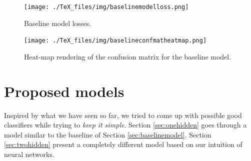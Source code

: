 \begin{figure}
\centering
\texttt{[image: ./TeX\_files/img/baselinemodelloss.png]}
\caption{Baseline model losses.}
\label{fig:baselinemodelloss}
\end{figure}

\begin{figure}
\centering
\texttt{[image: ./TeX\_files/img/baselineconfmatheatmap.png]}
\caption{Heat-map rendering of the confusion matrix for the baseline model.}
\label{fig:baselineconfmatheatmap}
\end{figure}

\begin{table}
\centering
{}
\caption{Precision, recall, f1-score summary table for the baseline model. Support indicates the number of occurrences of each particular class in the true responses (for the test set). Weighted avg is the per metric weighted average where the weights correspond to the support of that class.}
\label{tab:baselineclassificationrep}
\end{table}

\section{Proposed models}
Inspired by what we have seen so far, we tried to come up with possible good classifiers while trying to \textit{keep it simple}. Section \ref{sec:onehidden} goes through a model similar to the baseline of Section \ref{sec:baselinemodel}. Section \ref{sec:twohidden} present a completely different model based on our intuition of neural networks.
